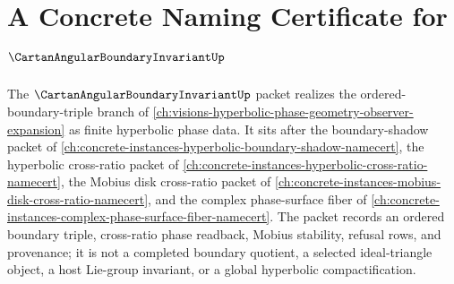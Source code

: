 \chapter{A Concrete Naming Certificate for $\CartanAngularBoundaryInvariantUp$}
\label{ch:concrete-instances-cartan-angular-boundary-invariant-namecert}

The $\CartanAngularBoundaryInvariantUp$ packet realizes the ordered-boundary-triple branch of \autoref{ch:visions-hyperbolic-phase-geometry-observer-expansion} as finite hyperbolic phase data. It sits after the boundary-shadow packet of \autoref{ch:concrete-instances-hyperbolic-boundary-shadow-namecert}, the hyperbolic cross-ratio packet of \autoref{ch:concrete-instances-hyperbolic-cross-ratio-namecert}, the Mobius disk cross-ratio packet of \autoref{ch:concrete-instances-mobius-disk-cross-ratio-namecert}, and the complex phase-surface fiber of \autoref{ch:concrete-instances-complex-phase-surface-fiber-namecert}. The packet records an ordered boundary triple, cross-ratio phase readback, Mobius stability, refusal rows, and provenance; it is not a completed boundary quotient, a selected ideal-triangle object, a host Lie-group invariant, or a global hyperbolic compactification.

